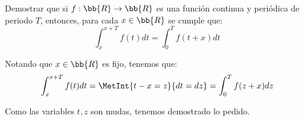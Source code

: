 \begin{ejercicio} Demostrar que si $f:\bb{R}\to \bb{R}$ es una función continua y periódica de periodo $T$, entonces, para cada $x\in \bb{R}$ se cumple que:
\begin{equation*}
    \int_x^{x+T}f(t)dt = \int_0^T f(t+x)dt
\end{equation*}

    Notando que $x\in \bb{R}$ es fijo, tenemos que:
    \begin{equation*}
        \int_x^{x+T}f(t)dt
        = \MetInt{t-x=z}{dt=dz}
        = \int_0^{T}f(z+x)dz
    \end{equation*}

    Como las variables $t,z$ son mudas, tenemos demostrado lo pedido.

    \begin{comment}
    Consideremos $x\in \bb{R}$ fijo. Sea $P\in \mathscr{P}[0,T]$. Se tiene que $P$ tiene asociada una única partición $\hat{P}\in \hat{\mathscr{P}}[x,x+~T]$ con $\hat{x_k} = x_k + x$. Sean $P,\hat{P}$ las siguientes particiones:
    \begin{gather*}
        P=\{x_0=0,x_1,\dots,x_n=T\} \\
        \hat{P}=\{\hat{x_0}=x,\hat{x_1}=x_1+x,\dots,\hat{x_n}=x_n+x=T+x\}
    \end{gather*}

    Análogamente, cada partición $\hat{P}\in \hat{\mathscr{P}}[x,x+T]$ tiene asociada una única partición $P\in \mathscr{P}[0,T]$ con $x_k = \hat{x_k}-x$.
    \begin{gather*}
        \hat{P}=\{\hat{x_0}=x,\hat{x_1},\dots,\hat{x_n}=T+x\}\\
        P=\{x_0=0,{x_1}=\hat{x_1}-x,\dots,x_n = \hat{x_n}-x=T\}
    \end{gather*}

    Es decir, tenemos la siguiente biyección:
    \begin{equation*}\begin{split}
        \mathscr{P}[0,T]& \Longleftrightarrow \hat{\mathscr{P}}[x,x+T] \\
        P &\;\;\overset{-x}{\underset{+x}{\leftrightarrows}}\;\; \hat{P}
    \end{split}\end{equation*}

    Por tanto, se tiene que:
    \begin{equation*}
        \Delta P_n \to 0 \Longleftrightarrow \Delta \hat{P}_n \to 0 \qquad\qquad (\Delta P = \Delta \hat{P} \quad\forall P,\hat{P})
    \end{equation*}



\end{comment}
\end{ejercicio}
